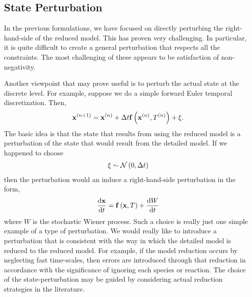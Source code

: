 \subsection{State Perturbation}
In the previous formulations, we have focused on directly
perturbing the right-hand-side of the reduced model.  This 
has proven very challenging.  In particular, it is quite 
difficult to create a general perturbation that respects 
all the constraints.  The most challenging of these 
appears to be satisfaction of non-negativity.

Another viewpoint that may prove useful is to perturb the 
actual state at the discrete level.  For example, suppose 
we do a simple forward Euler temporal discretization.  
Then, 
\begin{align}
  \mathbf{x}^{\left(n+1\right)} = \mathbf{x}^{\left(n\right)} + \Delta t \mathbf{f}\left(\mathbf{x}^{\left(n\right)}, T^{\left(n\right)}\right) 
       + \xi.
\end{align}
The basic idea is that the state that results from using 
the reduced model is a perturbation of the state 
that would result from the detailed model.  If we happened 
to choose 
\begin{align}
  \xi \sim \mathcal{N}\left(0,\Delta t\right)
\end{align}
then the perturbation would an induce a right-hand-side 
perturbation in the form, 
\begin{align}
  \frac{\mathrm{d} \mathbf{x}}{\mathrm{d} t} = \mathbf{f}\left(\mathbf{x}, T\right) + \frac{\mathrm{d} W}{\mathrm{d} t}
  \label{eq:stoch_chem}
\end{align}
where $W$ is the stochastic Wiener process. Such a choice is 
really just one simple example of a type of perturbation.  
We would really like to introduce a perturbation that is 
consistent with the way in which the detailed model is 
reduced to the reduced model.  For example, if the model 
reduction occurs by neglecting fast time-scales, then 
errors are introduced through that reduction in accordance 
with the significance of ignoring each species or reaction.  
The choice of the state-perturbation may be guided by 
considering actual reduction strategies in the literature.

